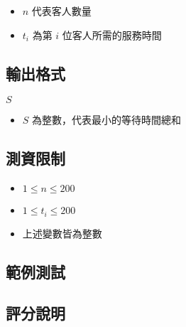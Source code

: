\begin{itemize}
\tightlist
\item
  \begin{math}n\end{math} 代表客人數量
\item
  \begin{math}t_i\end{math} 為第 \begin{math}i\end{math}
  位客人所需的服務時間
\end{itemize}

\subsection{輸出格式}

\begin{format}
\f{
$S$
}
\end{format}

\begin{itemize}
\tightlist
\item
  \begin{math}S\end{math} 為整數，代表最小的等待時間總和
\end{itemize}

\subsection{測資限制}

\begin{itemize}
\tightlist
\item
  \begin{math}1 \le n \le 200\end{math}
\item
  \begin{math}1 \le t_i \le 200\end{math}
\item
  上述變數皆為整數
\end{itemize}

\subsection{範例測試}

\begin{example}
%
%
%
\end{example}

\subsection{評分說明}

